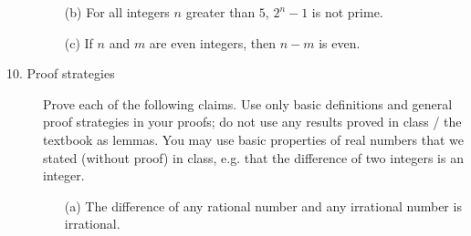 \documentclass[12pt, oneside]{article}
\newif \ifsolution
\begin{document}
\begin{description}
\begin{enumerate}
  \item[(b)] For all integers $n$ greater than $5$, $2^n-1$ is not prime.
  
  \ifsolution
  \soltwo{
  
  Define the predicate: $P(x)$ to mean ``$x$ is prime" with domain: $\mathbb{Z}$. 
  
  The sentence translates to $\forall n ( n > 5 \to \neg P(2^n - 1) )$.
  
  Its negation is 
  $\neg \forall n  \in \mathbb{Z} ( n > 5 \to \neg P(2^n - 1) ) \equiv \exists n \in  \mathbb{Z} (n > 5 \wedge P(2^n -1))$.
  
  The negation is true: to prove it, we need a  witness integer greater than  $5$ where 
  $2^n-1$ is prime.  Consider $n=7$,  an integer so  in the domain.  Calculating, $2^7 -1 =128-1 =127$.   This is a prime
  number because all integers greater than $1$ and less than $\sqrt{127}$  (namely   $2, 3, 4, 5, 6, 7, 8, 9, 10, 11$)
  are not factors of $127$.
  }
  \else{}
  \fi
  
  
  \item[(c)] If $n$ and $m$ are even integers, then $n - m$ is even.
  
  \ifsolution
  \soltwo{
  Define the predicate $E(x)$ to mean 	``$x$ is even" with domain $\mathbb{Z}$.  Note: this 
  predicate could be expressed symbolically as $\exists k \in  \mathbb{Z} (x=2k)$.
  
  The sentence translates to  $\forall x \in \mathbb{Z} ~\forall y \in \mathbb{Z}~( ( E(x) \wedge E(y) ) \to E(x-y) )$.
  
  Its negation is $$\neg \forall x \in \mathbb{Z} ~\forall y \in \mathbb{Z}~( ( E(x) \wedge E(y) ) \to E(x-y) ) 
  \equiv \exists x\in \mathbb{Z} \exists y \in \mathbb{Z} ( E(x) \wedge E(y) \wedge \neg E(x-y))$$
  
  The original statement is true: Towards universal generalization let $x,y$ be arbitrary integers and
  to show is $( E(x) \wedge E(y) ) \to E(x-y)$. Assume, towards
  a direct proof of the conditional that $x$ and $y$ are both even. We WTS that $x-y$ is even.  By definition of even, 
  there are integers $j, h$ such that $x=2j$ and $y=2h$.  Then $x-y = (2j) - (2h) = 2(j-h)$.
  Choosing the  witness $k=j-h$ (an integer), we have proved that $x - y$ is even.
  }
  \else{}
  \fi
  \end{enumerate}
  
  
  \item[10. Proof strategies] Prove each of the following claims.
  Use only basic definitions and general proof strategies in your proofs; 
  do not use any results proved in class / the textbook as lemmas. You may use basic 
  properties of real numbers that we stated (without proof) in class, e.g. that the difference of two
  integers is an integer.
  \begin{enumerate}
  \item[(a)] The difference of any rational number and any irrational number is irrational.
  

\end{enumerate}
\end{description}
\end{document}
